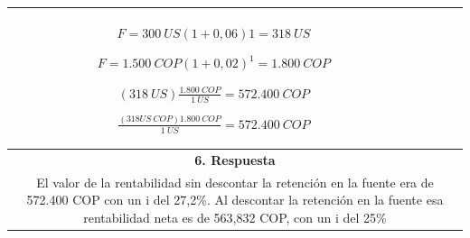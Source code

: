 \begin{center}
\begin{longtable}[H]{|c|c|c|}
{  $F = 300 \ US(1 + 0,06)1 = 318 \ US$ \vspace{3mm} \newline

  $F =  1{.}500 \ COP (1 + 0,02)^1=  1{.}800 \ COP$\newline

  $  (318 \ US)\frac{ 1{.}800 \ COP}{1 \ US}= 572{.}400 \ COP$\newline

  $ \frac{(318 US \  COP) 1{.}800 \ COP}{ 1 \ US} =  572{.}400 \ COP$ \newline
  }                                                                                                                         \\ \hline
\multicolumn{3}{|c|}{\cellcolor[HTML]{FFB183}\textbf{6. Respuesta}}                                         \\ \hline
\multicolumn{3}{|p{\textwidth}|}{El valor de la rentabilidad sin descontar la retención en la fuente era de 572.400 COP con un i del 27,2\%. Al descontar la retención en la fuente esa rentabilidad neta es de
563,832 COP, con un i del 25\%}  \\ \hline




 \end{longtable}
\end{center}